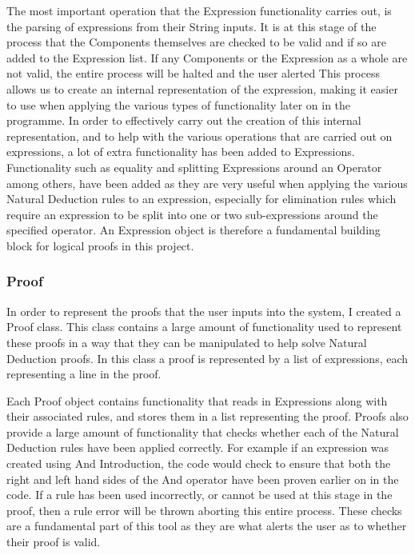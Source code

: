 The most important operation that the Expression functionality carries out, is the parsing of expressions from their String inputs. It is at this stage of the process that the Components themselves are checked to be valid and if so are added to the Expression list. If any Components or the Expression as a whole are not valid, the entire process will be halted and the user alerted This process allows us to create an internal representation of the expression, making it easier to use when applying the various types of functionality later on in the programme. In order to effectively carry out the creation of this internal representation, and to help with the various operations that are carried out on expressions, a lot of extra functionality has been added to Expressions. Functionality such as equality and splitting Expressions around an Operator among others, have been added as they are very useful when applying the various Natural Deduction rules to an expression, especially for elimination rules which require an expression to be split into one or two sub-expressions around the specified operator. An Expression object is therefore a fundamental building block for logical proofs in this project.

\subsubsection{Proof}

In order to represent the proofs that the user inputs into the system, I created a Proof class. This class contains a large amount of functionality used to represent these proofs in a way that they can be manipulated to help solve Natural Deduction proofs. In this class a proof is represented by a list of expressions, each representing a line in the proof. 

Each Proof object contains functionality that reads in Expressions along with their associated rules, and stores them in a list representing the proof. Proofs also provide a large amount of functionality that checks whether each of the Natural Deduction rules have been applied correctly.  For example if an expression was created using And Introduction, the code would check to ensure that both the right and left hand sides of the And operator have been proven earlier on in the code. If a rule has been used incorrectly, or cannot be used at this stage in the proof, then a rule error will be thrown aborting this entire process. These checks are a fundamental part of this tool as they are what alerts the user as to whether their proof is valid. 

